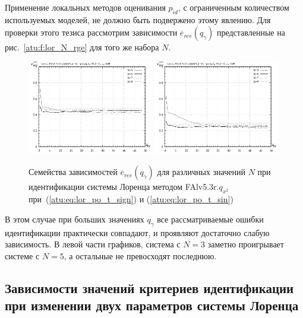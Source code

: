 Применение локальных методов оценивания $p_{id}$,
с ограниченным количеством используемых моделей, не должно быть подвержено
этому явлению. Для проверки этого тезиса рассмотрим зависимости
$\overline{e}_{ree}(q_\gamma)$
представленные на рис.~\ref{atu:f:lor_N_rge}
для того же набора $N$.

\begin{figure}[h!]
  \centerline{
    \includegraphics[width=0.49\textwidth]{p/cha/lor/FAlv5.3z/N/lor_FAlvN_3z_qx2_p_qg_e_ree_sign.png}
    \hfill
    \includegraphics[width=0.49\textwidth]{p/cha/lor/FAlv5.3z/N/lor_FAlvN_3z_qx2_p_qg_e_ree_sin.png}
  }
  \caption{Семейства зависимостей $\overline{e}_{ree}(q_\gamma)$ для различных значений $N$ при идентификации системы Лоренца методом FAlv5.3r.$q_{x^2}$
   при~(\ref{atu:eq:lor_po_t_sign}) и (\ref{atu:eq:lor_po_t_sin})}
  \label{atu:f:lor_N_ree}
\end{figure}

В этом случае при больших значениях $q_\gamma$ все рассматриваемые ошибки идентификации
практически совпадают, и проявляют достаточно слабую зависимость.
В левой части графиков, система с $N=3$ заметно
проигрывает системе с $N=5$, а остальные не превосходят последнюю.









\subsection{Зависимости значений критериев идентификации при изменении двух параметров системы Лоренца}

